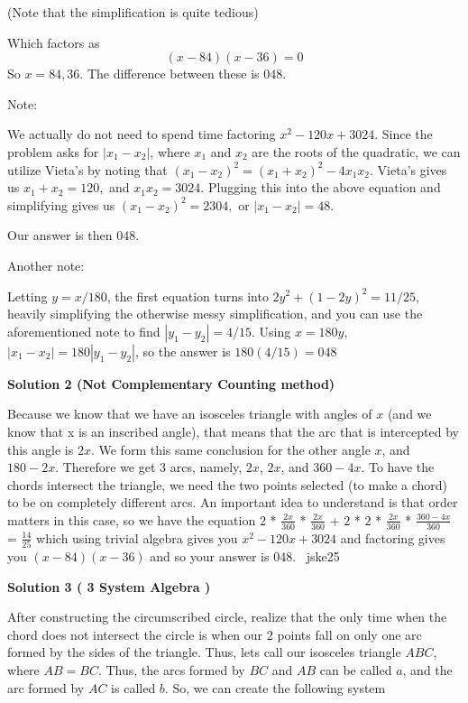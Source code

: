 \begin{enumerate}
 (Note that the simplification is quite tedious)

 Which factors as 
 \[(x-84)(x-36)=0\]So $x=84, 36$. The difference between these is $\boxed{048}$.

 
Note:

 We actually do not need to spend time factoring $x^2 - 120x + 3024$. Since the problem asks for $|x_1 - x_2|$, where $x_1$ and $x_2$ are the roots of the quadratic, we can utilize Vieta's by noting that $(x_1 - x_2) ^ 2 = (x_1 + x_2) ^ 2 - 4x_1x_2$. Vieta's gives us $x_1 + x_2 = 120,$ and $x_1x_2 = 3024.$ Plugging this into the above equation and simplifying gives us $(x_1 - x_2) ^ 2 = 2304,$ or $|x_1 - x_2| = 48$. 

 Our answer is then $\boxed{048}$.

 Another note: 

 Letting $y = x/180$, the first equation turns into $2y^2 + (1-2y)^2 = 11/25$, heavily simplifying the otherwise messy simplification, and you can use the aforementioned note to find $|y_1 - y_2| = 4/15$. Using $x = 180y$, $|x_1 - x_2| =  180|y_1 - y_2|$, so the answer is $180(4/15) = \boxed{048}$




\textbf{Solution 2 (Not Complementary Counting method)}

Because we know that we have an isosceles triangle with angles of $x$ (and we know that x is an inscribed angle), that means that the arc that is intercepted by this angle is $2x$. We form this same conclusion for the other angle $x$, and $180-2x$. Therefore we get $3$ arcs, namely, $2x$, $2x$, and $360-4x$. To have the chords intersect the triangle, we need the two points selected (to make a chord) to be on completely different arcs. An important idea to understand is that order matters in this case, so we have the equation $2$ * $\frac{2x}{360}$ * $\frac{2x}{360}$ + $2$ * $2$ * $\frac{2x}{360}$ * $\frac{360-4x}{360}$ = $\frac{14}{25}$ which using trivial algebra gives you $x^2-120x+3024$ and factoring gives you $(x-84)(x-36)$ and so your answer is $\boxed{048}$. ~jske25

 



\textbf{Solution 3 ( 3 System Algebra )}

After constructing the circumscribed circle, realize that the only time when the chord does not intersect the circle is when our $2$ points fall on only one arc formed by the sides of the triangle. Thus, lets call our isosceles triangle  $ABC$, where $AB=BC$. Thus, the arcs formed by $BC$ and $AB$ can be called $a$, and the arc formed by $AC$ is called $b$. So, we can create the following system


\end{enumerate}
